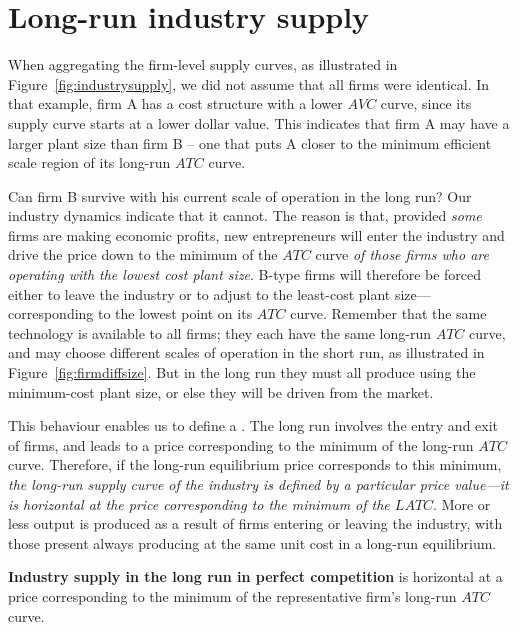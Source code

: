 \section{Long-run industry supply}\label{sec:ch9sec5}

When aggregating the firm-level supply curves, as illustrated in 
Figure~\ref{fig:industrysupply}, we did not assume that all firms were identical. In
that example, firm A has a cost structure with a lower $AVC$ curve, since
its supply curve starts at a lower dollar value. This indicates that firm A
may have a larger plant size than firm B -- one that puts A closer to the
minimum efficient scale region of its long-run $ATC$ curve.



\newhtmlpage

Can firm B survive with his current scale of operation in the long run? Our
industry dynamics indicate that it cannot. The reason is that, provided 
\textit{some} firms are making economic profits, new entrepreneurs will
enter the industry and drive the price down to the minimum of the $ATC$ curve 
\textit{of those firms who are operating with the lowest cost plant size}.
B-type firms will therefore be forced either to leave the industry or to
adjust to the least-cost plant size---corresponding to the lowest point on
its  $ATC$ curve. Remember that the same technology is
available to all firms; they each have the same long-run $ATC$ curve, and
may choose different scales of operation in the short run, as illustrated in
Figure~\ref{fig:firmdiffsize}. But in the long run they must all produce
using the minimum-cost plant size, or else they will be driven from the
market.

This behaviour enables us to define a . 
The long run involves the entry and exit of firms, and leads to a price
corresponding to the minimum of the long-run $ATC$ curve. Therefore, if the
long-run equilibrium price corresponds to this minimum, \textit{the long-run
supply curve of the industry is defined by a particular price value---it is
horizontal at the price corresponding to the minimum of the $LATC$}. More or
less output is produced as a result of firms entering or leaving the
industry, with those present always producing at the same unit cost in a
long-run equilibrium.

\begin{DefBox}
	\textbf{Industry supply in the long run in perfect competition} is horizontal at a price corresponding to the minimum of the representative firm's long-run $ATC$ curve.
\end{DefBox}

